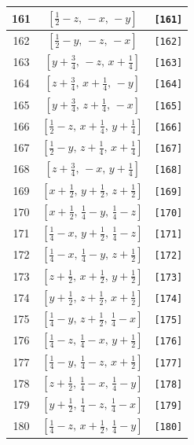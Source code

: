 \documentclass[fleqn,8pt]{jsarticle}
\begin{document}
\begin{longtable}{ccc}
161 & $\left[ \frac{1}{2} - z,\, - x,\, - y \right]$ & {\tt [161]} \\ \hline
162 & $\left[ \frac{1}{2} - y,\, - z,\, - x \right]$ & {\tt [162]} \\ \hline
163 & $\left[ y + \frac{3}{4},\, - z,\, x + \frac{1}{4} \right]$ & {\tt [163]} \\ \hline
164 & $\left[ z + \frac{3}{4},\, x + \frac{1}{4},\, - y \right]$ & {\tt [164]} \\ \hline
165 & $\left[ y + \frac{3}{4},\, z + \frac{1}{4},\, - x \right]$ & {\tt [165]} \\ \hline
166 & $\left[ \frac{1}{2} - z,\, x + \frac{1}{4},\, y + \frac{1}{4} \right]$ & {\tt [166]} \\ \hline
167 & $\left[ \frac{1}{2} - y,\, z + \frac{1}{4},\, x + \frac{1}{4} \right]$ & {\tt [167]} \\ \hline
168 & $\left[ z + \frac{3}{4},\, - x,\, y + \frac{1}{4} \right]$ & {\tt [168]} \\ \hline
169 & $\left[ x + \frac{1}{2},\, y + \frac{1}{2},\, z + \frac{1}{2} \right]$ & {\tt [169]} \\ \hline
170 & $\left[ x + \frac{1}{2},\, \frac{1}{4} - y,\, \frac{1}{4} - z \right]$ & {\tt [170]} \\ \hline
171 & $\left[ \frac{1}{4} - x,\, y + \frac{1}{2},\, \frac{1}{4} - z \right]$ & {\tt [171]} \\ \hline
172 & $\left[ \frac{1}{4} - x,\, \frac{1}{4} - y,\, z + \frac{1}{2} \right]$ & {\tt [172]} \\ \hline
173 & $\left[ z + \frac{1}{2},\, x + \frac{1}{2},\, y + \frac{1}{2} \right]$ & {\tt [173]} \\ \hline
174 & $\left[ y + \frac{1}{2},\, z + \frac{1}{2},\, x + \frac{1}{2} \right]$ & {\tt [174]} \\ \hline
175 & $\left[ \frac{1}{4} - y,\, z + \frac{1}{2},\, \frac{1}{4} - x \right]$ & {\tt [175]} \\ \hline
176 & $\left[ \frac{1}{4} - z,\, \frac{1}{4} - x,\, y + \frac{1}{2} \right]$ & {\tt [176]} \\ \hline
177 & $\left[ \frac{1}{4} - y,\, \frac{1}{4} - z,\, x + \frac{1}{2} \right]$ & {\tt [177]} \\ \hline
178 & $\left[ z + \frac{1}{2},\, \frac{1}{4} - x,\, \frac{1}{4} - y \right]$ & {\tt [178]} \\ \hline
179 & $\left[ y + \frac{1}{2},\, \frac{1}{4} - z,\, \frac{1}{4} - x \right]$ & {\tt [179]} \\ \hline
180 & $\left[ \frac{1}{4} - z,\, x + \frac{1}{2},\, \frac{1}{4} - y \right]$ & {\tt [180]} \\ \hline

\end{longtable}
\end{document}

